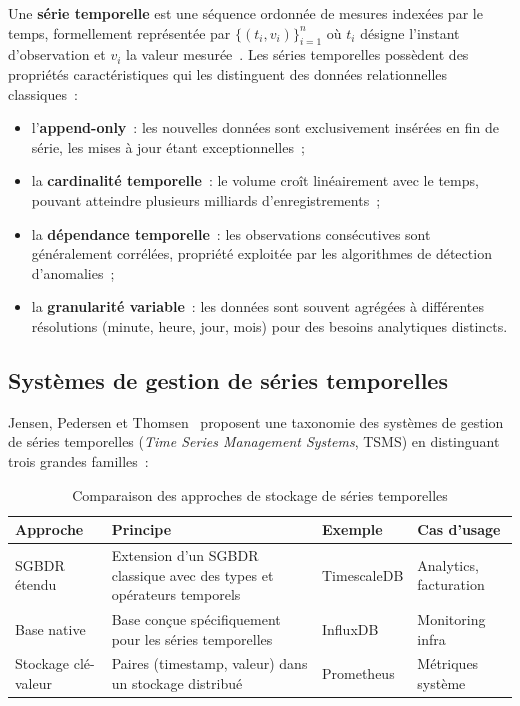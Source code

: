 Une \textbf{série temporelle} est une séquence ordonnée de mesures indexées par le temps, formellement représentée par $\{(t_i, v_i)\}_{i=1}^{n}$ où $t_i$ désigne l'instant d'observation et $v_i$ la valeur mesurée~\cite{jensen2017}. Les séries temporelles possèdent des propriétés caractéristiques qui les distinguent des données relationnelles classiques~:

\begin{itemize}[noitemsep]
    \item l'\textbf{append-only}~: les nouvelles données sont exclusivement insérées en fin de série, les mises à jour étant exceptionnelles~;
    \item la \textbf{cardinalité temporelle}~: le volume croît linéairement avec le temps, pouvant atteindre plusieurs milliards d'enregistrements~;
    \item la \textbf{dépendance temporelle}~: les observations consécutives sont généralement corrélées, propriété exploitée par les algorithmes de détection d'anomalies~;
    \item la \textbf{granularité variable}~: les données sont souvent agrégées à différentes résolutions (minute, heure, jour, mois) pour des besoins analytiques distincts.
\end{itemize}

\subsection{Systèmes de gestion de séries temporelles}

Jensen, Pedersen et Thomsen~\cite{jensen2017} proposent une taxonomie des systèmes de gestion de séries temporelles (\textit{Time Series Management Systems}, TSMS) en distinguant trois grandes familles~:

\begin{table}[H]
\centering
\caption{Comparaison des approches de stockage de séries temporelles}
\label{tab:tsms_comparaison}
\begin{tabularx}{\textwidth}{|l|X|X|l|}
\hline
\textbf{Approche} & \textbf{Principe} & \textbf{Exemple} & \textbf{Cas d'usage} \\
\hline
SGBDR étendu & Extension d'un SGBDR classique avec des types et opérateurs temporels & TimescaleDB & Analytics, facturation \\
\hline
Base native & Base conçue spécifiquement pour les séries temporelles & InfluxDB & Monitoring infra \\
\hline
Stockage clé-valeur & Paires (timestamp, valeur) dans un stockage distribué & Prometheus & Métriques système \\
\hline
\end{tabularx}
\end{table}

